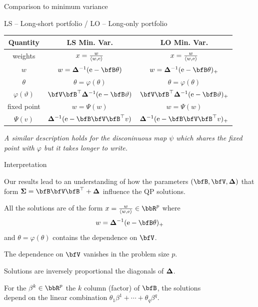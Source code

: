\documentclass[11pt,leqno]{beamer}
\begin{document}
\begin{frame}{Comparison to minimum variance}

LS -- Long-short portfolio /
LO -- Long-only portfolio

\begin{table}
\renewcommand{\arraystretch}{1.32}
  \begin{tabular}{ccc}
\toprule
  Quantity & 
  LS Min. Var. & LO Min. Var. \\
\midrule
 weights 
 & $x = \frac{w}{\langle w, \mathrm{e} \rangle}$
 & $x = \frac{w}{\langle w, \mathrm{e} \rangle}$ \\
 $w$ 
 & $w = \bdel^{-1} (\rme - \bfB \theta)$ 
 & $w = \bdel^{-1} (\rme - \bfB \theta)_+$ \\
 $\theta$ 
 & $\theta = \varphi(\theta)$
 & $\theta = \varphi(\theta)$ \\
 $\varphi(\vartheta)$ 
 & $\bfV \bfB^\top \bdel^{-1} (\rme - \bfB \vartheta)$ 
 & $\bfV \bfB^\top \bdel^{-1} (\rme - \bfB \vartheta)_+$ \\
 fixed point
 & $w = \Psi(w)$
 & $w = \Psi(w)$ \\
 $\Psi (v)$ 
 & $\bdel^{-1} (\rme - \bfB \bfV \bfB^\top v)$
 & $\bdel^{-1} (\rme - \bfB \bfV \bfB^\top v)_+$
 \\
\bottomrule
\end{tabular}
\end{table}

\footnotesize{\it *A similar description 
holds for the disconinuous map $\psi$ which shares the 
fixed point with $\varphi$ but it takes longer to write.}


\end{frame}




\begin{frame}{Interpretation}


Our results lead to an understanding of how the
 parameters $(\bfB, \bfV, \bdel)$
that form $\bsig = \bfB \bfV \bfB^\top + \bdel$ 
influence the QP solutions.


All the solutions are of the form 
$x = \frac{w}{\prj{w}{\rme}} \in \bbR^p$
where 
\begin{align}
   w = \bdel^{-1} (\rme - \bfB \theta)_+
\end{align}
and $\theta = \varphi(\theta)$
contains the dependence on $\bfV$.

\begin{itemize}{\it
  \item The dependence on $\bfV$ vanishes in the problem
size $p$.
  \item Solutions are inversely proportional the diagonals
of $\bm{\Delta}$.
  \item For the $\beta^k \in \bbR^p$ the $k$ column 
(factor) of $\bfB$, the solutions \\
  \s[6] depend  on the linear combination
  $\theta_1 \beta^1 + \cdots + \theta_q \beta^q$.
 }
\end{itemize}


\end{frame}
\end{document}
